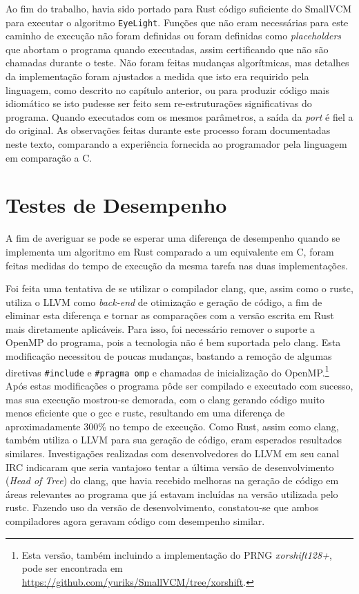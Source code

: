\documentclass[tg]{mdtufsm}
\def\Cpp{{C\nolinebreak[4]\raisebox{.20ex}{\small\bf++}}}
\begin{document}
Ao fim do trabalho, havia sido portado para Rust código suficiente do SmallVCM para executar o algoritmo \texttt{EyeLight}. Funções que não eram necessárias para este caminho de execução não foram definidas ou foram definidas como \emph{placeholders} que abortam o programa quando executadas, assim certificando que não são chamadas durante o teste. Não foram feitas mudanças algorítmicas, mas detalhes da implementação foram ajustados a medida que isto era requirido pela linguagem, como descrito no capítulo anterior, ou para produzir código mais idiomático se isto pudesse ser feito sem re-estruturações significativas do programa. Quando executados com os mesmos parâmetros, a saída da \emph{port} é fiel a do original. As observações feitas durante este processo foram documentadas neste texto, comparando a experiência fornecida ao programador pela linguagem em comparação a \Cpp.

\section{Testes de Desempenho}

A fim de averiguar se pode se esperar uma diferença de desempenho quando se implementa um algoritmo em Rust comparado a um equivalente em \Cpp, foram feitas medidas do tempo de execução da mesma tarefa nas duas implementações.

Foi feita uma tentativa de se utilizar o compilador clang, que, assim como o rustc, utiliza o LLVM como \emph{back-end} de otimização e geração de código, a fim de eliminar esta diferença e tornar as comparações com a versão escrita em Rust mais diretamente aplicáveis. Para isso, foi necessário remover o suporte a OpenMP do programa, pois a tecnologia não é bem suportada pelo clang. Esta modificação necessitou de poucas mudanças, bastando a remoção de algumas diretivas \texttt{\#include} e \texttt{\#pragma omp} e chamadas de inicialização do OpenMP.\footnote{Esta versão, também incluindo a implementação do PRNG \emph{xorshift128+}, pode ser encontrada em \url{https://github.com/yuriks/SmallVCM/tree/xorshift}.} Após estas modificações o programa pôde ser compilado e executado com sucesso, mas sua execução mostrou-se demorada, com o clang gerando código muito menos eficiente que o gcc e rustc, resultando em uma diferença de aproximadamente 300\% no tempo de execução. Como Rust, assim como clang, também utiliza o LLVM para sua geração de código, eram esperados resultados similares. Investigações realizadas com desenvolvedores do LLVM em seu canal IRC indicaram que seria vantajoso tentar a última versão de desenvolvimento (\emph{Head of Tree}) do clang, que havia recebido melhoras na geração de código em áreas relevantes ao programa que já estavam incluídas na versão utilizada pelo rustc. Fazendo uso da versão de desenvolvimento, constatou-se que ambos compiladores agora geravam código com desempenho similar.
\end{document}
